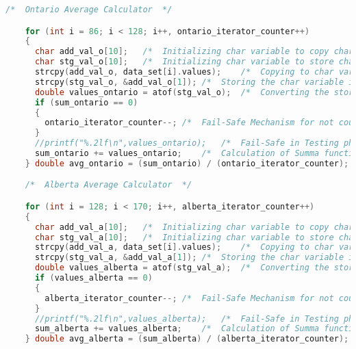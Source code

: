 \begin{lstlisting}[language=C, caption=\textit{CPS 188 Term Project Source Code}]
    /*  Ontario Average Calculator  */

    for (int i = 86; i < 128; i++, ontario_iterator_counter++)
    {
      char add_val_o[10];   /*  Initializing char variable to copy char pointer to char variable type   */
      char stg_val_o[10];   /*  Initializing char variable to store char to char recieved from char pointer */
      strcpy(add_val_o, data_set[i].values);    /*  Copying to char variable from char pointer variable */
      strcpy(stg_val_o, &add_val_o[1]); /*  Storing the char variable in another char variable to manipulate string literals    */
      double values_ontario = atof(stg_val_o);  /*  Converting the stored char variable to a float type varaible data type for mathematical computational maniupulation */
      if (sum_ontario == 0)
      {
        ontario_iterator_counter--; /*  Fail-Safe Mechanism for not counting the iterations in the iterating counter factor if the condition is met [CONDITION IS ONLY SATISFIED IF THE atof FUNCTION RETURN 0, IFF THE Var(char) = NULL]   */
      }
      //printf("%.2lf\n",values_ontario);   /*  Fail-Safe in Testing phase to verify succinctity of the values being read from atof function    */
      sum_ontario += values_ontario;    /*  Calculation of Summa function of all data points being read that are not NULL   */
    } double avg_ontario = (sum_ontario) / (ontario_iterator_counter); printf("Ontario Average: %.3lf\n", avg_ontario);

    /*  Alberta Average Calculator  */

    for (int i = 128; i < 170; i++, alberta_iterator_counter++)
    {
      char add_val_a[10];   /*  Initializing char variable to copy char pointer to char variable type   */
      char stg_val_a[10];   /*  Initializing char variable to store char to char recieved from char pointer */
      strcpy(add_val_a, data_set[i].values);    /*  Copying to char variable from char pointer variable */
      strcpy(stg_val_a, &add_val_a[1]); /*  Storing the char variable in another char variable to manipulate string literals    */
      double values_alberta = atof(stg_val_a);  /*  Converting the stored char variable to a float type varaible data type for mathematical computational maniupulation */
      if (values_alberta == 0)
      {
        alberta_iterator_counter--; /*  Fail-Safe Mechanism for not counting the iterations in the iterating counter factor if the condition is met [CONDITION IS ONLY SATISFIED IF THE atof FUNCTION RETURN 0, IFF THE Var(char) = NULL]   */
      }
      //printf("%.2lf\n",values_alberta);   /*  Fail-Safe in Testing phase to verify succinctity of the values being read from atof function    */
      sum_alberta += values_alberta;    /*  Calculation of Summa function of all data points being read that are not NULL   */
    } double avg_alberta = (sum_alberta) / (alberta_iterator_counter); printf("Alberta Average: %.3lf\n", avg_alberta);


\end{lstlisting}
